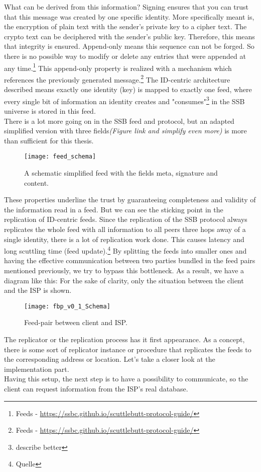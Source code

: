 What can be derived from this information? Signing ensures that you can trust that this message was created by one specific identity. More specifically meant is, the encryption of plain text with the sender’s private key to a cipher text. The crypto text can be deciphered with the sender’s public key. Therefore, this means that integrity is ensured. Append-only means this sequence can not be forged. So there is no possible way to modify or delete any entries that were appended at any time.\footnote{Feeds - \url{https://ssbc.github.io/scuttlebutt-protocol-guide/}} This append-only property is realized with a mechanism which references the previously generated message.\footnote{Feeds - \url{https://ssbc.github.io/scuttlebutt-protocol-guide/}} The ID-centric architecture described means exactly one identity (key) is mapped to exactly one feed, where every single bit of information an identity creates and "consumes"\footnote{describe better} in the SSB universe is stored in this feed.
\\
There is a lot more going on in the SSB feed and protocol, but an adapted simplified version with three fields\textit{(Figure link and simplify even more)} is more than sufficient for this thesis. 

\begin{figure}
    \centering
    \texttt{[image: feed\_schema]}
    \caption{A schematic simplified feed with the fields meta, signature and content.}
    \label{fig:feed_schema}
\end{figure}



These properties underline the trust by guaranteeing completeness and validity of the information read in a feed. But we can see the sticking point in the replication of ID-centric feeds. Since the replication of the SSB protocol always replicates the whole feed with all information to all peers three hops away of a single identity, there is a lot of replication work done. This causes latency and long scuttling time (feed update).\footnote{Quelle} By splitting the feeds into smaller ones and having the effective communication between two parties bundled in the feed pairs mentioned previously, we try to bypass this bottleneck. As a result, we have a diagram like this: For the sake of clarity, only the situation between the client and the ISP is shown. 

\begin{figure}
    \centering
    \texttt{[image: fbp\_v0\_1\_Schema]}
    \caption{Feed-pair between client and ISP.}
    \label{fig:contract_cli_isp}
\end{figure}
The replicator or the replication process has it first appearance. As a concept, there is some sort of replicator instance or procedure that replicates the feeds to the corresponding address or location. Let's take a closer look at the implementation part. \\
Having this setup, the next step is to have a possibility to communicate, so the client can request information from the ISP’s real database.

